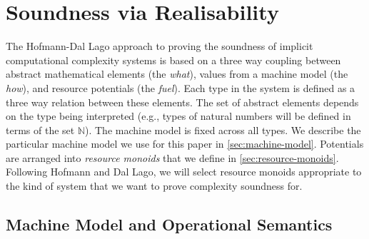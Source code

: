 \documentclass[acmsmall,review]{acmart}
\begin{document}
\section{Soundness via Realisability}
\label{sec:soundness}

\newcommand{\cstaccess}{c_{\mathit{access}}}
\newcommand{\cstmkclo}{c_{\mathit{mkclo}}}
\newcommand{\cstapp}{c_{\mathit{app}}}
\newcommand{\cstmkpair}{c_{\mathit{mkpair}}}
\newcommand{\cstmkunit}{c_{\mathit{mkunit}}}
\newcommand{\cstTrue}{c_{\mathit{mktrue}}}
\newcommand{\cstFalse}{c_{\mathit{mkfalse}}}
\newcommand{\cstLetpair}{c_{\mathit{letpair}}}
\newcommand{\cstSeq}{c_{\mathit{seq}}}
\newcommand{\cstIf}{c_{\mathit{if}}}

\newcommand{\clo}[2]{\mathsf{clo}\langle #1 , #2 \rangle}
\newcommand{\synTrue}{\mathsf{true}}
\newcommand{\synFalse}{\mathsf{false}}

\newcommand{\ExpSet}{\mathcal{E}}
\newcommand{\ValSet}{\mathcal{V}}

The Hofmann-Dal Lago approach to proving the soundness of implicit
computational complexity systems is based on a three way coupling
between abstract mathematical elements (the \emph{what}), values from
a machine model (the \emph{how}), and resource potentials (the
\emph{fuel}). Each type in the system is defined as a three way
relation between these elements. The set of abstract elements depends
on the type being interpreted (e.g., types of natural numbers will be
defined in terms of the set $\mathbb{N}$). The machine model is fixed
across all types. We describe the particular machine model we use for
this paper in \autoref{sec:machine-model}. Potentials are arranged
into \emph{resource monoids} that we define in
\autoref{sec:resource-monoids}. Following Hofmann and Dal Lago, we
will select resource monoids appropriate to the kind of system that we
want to prove complexity soundness for.

\subsection{Machine Model and Operational Semantics}
\label{sec:machine-model}
\end{document}
